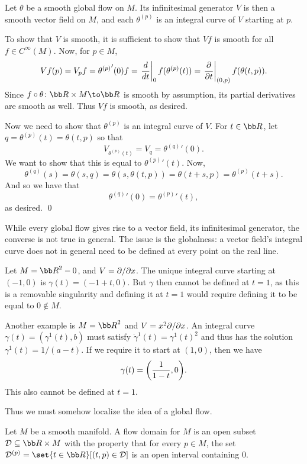     Let $\theta$ be a smooth global flow on $M$.
    Its infinitesimal generator $V$ is then a smooth vector field on $M$, and each $\theta^{(p)}$ is an integral curve of $V$ starting at $p$.

\eprop

\bproof

    To show that $V$ is smooth, it is sufficient to show that $Vf$ is smooth for all $f\in C^\infty(M)$.
    Now, for $p\in M$,
    $$ Vf(p) = V_pf = {\theta^{(p)}}'(0)f = \left.{{d}\over{dt}}\right|_0f(\theta^{(p)}(t)) = \left.{{\partial }\over{\partial t}}\right|_{(0,p)}f(\theta(t,p)) . $$
    Since $f\circ\theta\colon\bR\times M\to\bR$ is smooth by assumption, its partial derivatives are smooth as well.
    Thus $Vf$ is smooth, as desired.

    Now we need to show that $\theta^{(p)}$ is an integral curve of $V$.
    For $t\in\bR$, let $q=\theta^{(p)}(t)=\theta(t,p)$ so that
    $$ V_{\theta^{(p)}(t)} = V_q = {\theta^{(q)}}'(0) . $$
    We want to show that this is equal to ${\theta^{(p)}}'(t)$.
    Now,
    $$ \theta^{(q)}(s) = \theta(s,q) = \theta(s,\theta(t,p)) = \theta(t+s,p) = \theta^{(p)}(t+s) . $$
    And so we have that
    $$ {\theta^{(q)}}'(0) = {\theta^{(p)}}'(t), $$
    as desired.
    \qed

\eproof

While every global flow gives rise to a vector field, its infinitesimal generator, the converse is not true in general.
The issue is the globalness: a vector field's integral curve does not in general need to be defined at every point on the real line.

\bexam

    Let $M=\bR^2-0$, and $V=\partial /\partial x$.
    The unique integral curve starting at $(-1,0)$ is $\gamma(t)=(-1+t,0)$.
    But $\gamma$ then cannot be defined at $t=1$, as this is a removable singularity and defining it at $t=1$ would require defining it to be equal to $0\notin M$.

    Another example is $M=\bR^2$ and $V=x^2\partial /\partial x$.
    An integral curve $\gamma(t)=(\gamma^1(t),b)$ must satisfy $\dot\gamma^1(t)=\gamma^1(t)^2$ and thus has the solution $\gamma^1(t)=1/(a-t)$.
    If we require it to start at $(1,0)$, then we have
    $$ \gamma(t) = \mathopen{}\mathclose{\left({{1}\over{1-t}},0\right)} . $$
    This also cannot be defined at $t=1$.

\eexam

Thus we must somehow localize the idea of a global flow.

\bdefn

    Let $M$ be a smooth manifold.
    A {\emphcolor flow domain} for $M$ is an open subset $\D\subseteq\bR\times M$ with the property that for every $p\in M$, the set $\D^{(p)}=\set{t\in\bR}[(t,p)\in\D]$
    is an open interval containing $0$.

